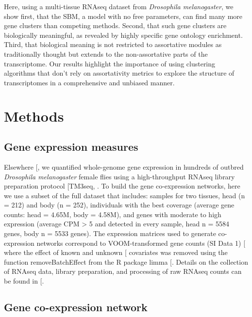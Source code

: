 \documentclass[
]{article}
\begin{document}
Here, using a multi-tissue RNAseq dataset from \emph{Drosophila
melanogaster}, we show first, that the SBM, a model with no free
parameters, can find many more gene clusters than competing methods.
Second, that such gene clusters are biologically meaningful, as revealed
by highly specific gene ontology enrichment. Third, that biological
meaning is not restricted to assortative modules as traditionally
thought but extends to the non-assortative parts of the transcriptome.
Our results highlight the importance of using clustering algorithms that
don't rely on assortativity metrics to explore the structure of
transcriptomes in a comprehensive and unbiased manner.

\section{Methods}\label{methods}

\subsection{Gene expression measures}\label{gene-expression-measures}

Elsewhere {[}\citeproc{ref-Pallares2023-eQTL}{20}{]}, we quantified
whole-genome gene expression in hundreds of outbred \emph{Drosophila
melanogaster} female flies using a high-throughput RNAseq library
preparation protocol {[}TM3seq, \citeproc{ref-Pallares2020-ha}{21}{]}.
To build the gene co-expression networks, here we use a subset of the
full dataset that includes: samples for two tissues, head (n = 212) and
body (n = 252), individuals with the best coverage (average gene counts:
head = 4.65M, body = 4.58M), and genes with moderate to high expression
(average CPM \textgreater{} 5 and detected in every sample, head n =
5584 genes, body n = 5533 genes). The expression matrices used to
generate co-expression networks correspond to VOOM-transformed gene
counts (SI Data 1) {[}\citeproc{ref-Law2014-xl}{22}{]} where the effect
of known and unknown {[}\citeproc{ref-Leek2007-bx}{23}{]} covariates was
removed using the function removeBatchEffect from the R package limma
{[}\citeproc{ref-Law2014-xl}{22}{]}. Details on the collection of RNAseq
data, library preparation, and processing of raw RNAseq counts can be
found in {[}\citeproc{ref-Pallares2023-eQTL}{20}{]}.

\subsection{Gene co-expression
network}\label{gene-co-expression-network}
\end{document}
